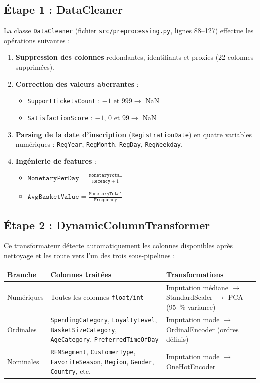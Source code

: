 \documentclass[11pt,a4paper]{article}
\begin{document}
\subsection{Étape 1 : DataCleaner}

La classe \texttt{DataCleaner} (fichier \texttt{src/preprocessing.py}, lignes 88--127) effectue les opérations suivantes :

\begin{enumerate}[noitemsep]
    \item \textbf{Suppression des colonnes} redondantes, identifiants et proxies (22 colonnes supprimées).
    \item \textbf{Correction des valeurs aberrantes} :
        \begin{itemize}[noitemsep]
            \item \texttt{SupportTicketsCount} : $-1$ et $999 \to$ NaN
            \item \texttt{SatisfactionScore} : $-1$, $0$ et $99 \to$ NaN
        \end{itemize}
    \item \textbf{Parsing de la date d'inscription} (\texttt{RegistrationDate}) en quatre variables numériques : \texttt{RegYear}, \texttt{RegMonth}, \texttt{RegDay}, \texttt{RegWeekday}.
    \item \textbf{Ingénierie de features} :
        \begin{itemize}[noitemsep]
            \item $\texttt{MonetaryPerDay} = \frac{\texttt{MonetaryTotal}}{\texttt{Recency} + 1}$
            \item $\texttt{AvgBasketValue} = \frac{\texttt{MonetaryTotal}}{\texttt{Frequency}}$
        \end{itemize}
\end{enumerate}

\subsection{Étape 2 : DynamicColumnTransformer}

Ce transformateur détecte automatiquement les colonnes disponibles après nettoyage et les route vers l'un des trois sous-pipelines :

\begin{center}
\begin{tabular}{L{3.5cm} L{5cm} L{5cm}}
\toprule
\textbf{Branche} & \textbf{Colonnes traitées} & \textbf{Transformations} \\
\midrule
Numériques & Toutes les colonnes \texttt{float/int} & Imputation médiane $\to$ StandardScaler $\to$ PCA (95~\% variance) \\
Ordinales & \texttt{SpendingCategory}, \texttt{LoyaltyLevel}, \texttt{BasketSizeCategory}, \texttt{AgeCategory}, \texttt{PreferredTimeOfDay} & Imputation mode $\to$ OrdinalEncoder (ordres définis) \\
Nominales & \texttt{RFMSegment}, \texttt{CustomerType}, \texttt{FavoriteSeason}, \texttt{Region}, \texttt{Gender}, \texttt{Country}, etc. & Imputation mode $\to$ OneHotEncoder \\
\bottomrule
\end{tabular}
\end{center}
\end{document}

